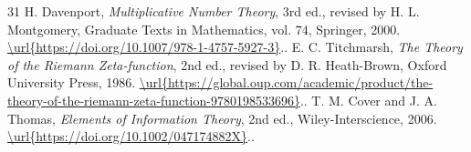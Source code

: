 \begin{thebibliography}{31}
 H. Davenport, \emph{Multiplicative Number Theory}, 3rd ed., revised by H. L. Montgomery, Graduate Texts in Mathematics, vol. 74, Springer, 2000. \url{\url{https://doi.org/10.1007/978-1-4757-5927-3}}..
 E. C. Titchmarsh, \emph{The Theory of the Riemann Zeta-function}, 2nd ed., revised by D. R. Heath-Brown, Oxford University Press, 1986. \url{\url{https://global.oup.com/academic/product/the-theory-of-the-riemann-zeta-function-9780198533696}}..
 T. M. Cover and J. A. Thomas, \emph{Elements of Information Theory}, 2nd ed., Wiley-Interscience, 2006. \url{\url{https://doi.org/10.1002/047174882X}}..
\end{thebibliography}
